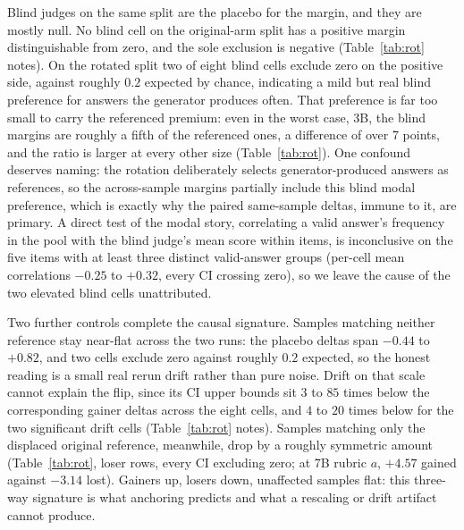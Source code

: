 \documentclass[11pt]{article}
\begin{document}
Blind judges on the same split are the placebo for the margin, and they are mostly null.
No blind cell on the original-arm split has a positive margin distinguishable from zero, and the sole exclusion is negative (Table~\ref{tab:rot} notes).
On the rotated split two of eight blind cells exclude zero on the positive side, against roughly $0.2$ expected by chance, indicating a mild but real blind preference for answers the generator produces often.
That preference is far too small to carry the referenced premium: even in the worst case, 3B, the blind margins are roughly a fifth of the referenced ones, a difference of over 7 points, and the ratio is larger at every other size (Table~\ref{tab:rot}).
One confound deserves naming: the rotation deliberately selects generator-produced answers as references, so the across-sample margins partially include this blind modal preference, which is exactly why the paired same-sample deltas, immune to it, are primary.
A direct test of the modal story, correlating a valid answer's frequency in the pool with the blind judge's mean score within items, is inconclusive on the five items with at least three distinct valid-answer groups (per-cell mean correlations $-0.25$ to $+0.32$, every CI crossing zero), so we leave the cause of the two elevated blind cells unattributed.

Two further controls complete the causal signature.
Samples matching neither reference stay near-flat across the two runs: the placebo deltas span $-0.44$ to $+0.82$, and two cells exclude zero against roughly $0.2$ expected, so the honest reading is a small real rerun drift rather than pure noise.
Drift on that scale cannot explain the flip, since its CI upper bounds sit $3$ to $85$ times below the corresponding gainer deltas across the eight cells, and $4$ to $20$ times below for the two significant drift cells (Table~\ref{tab:rot} notes).
Samples matching only the displaced original reference, meanwhile, drop by a roughly symmetric amount (Table~\ref{tab:rot}, loser rows, every CI excluding zero; at 7B rubric $a$, $+4.57$ gained against $-3.14$ lost).
Gainers up, losers down, unaffected samples flat: this three-way signature is what anchoring predicts and what a rescaling or drift artifact cannot produce.
\end{document}
